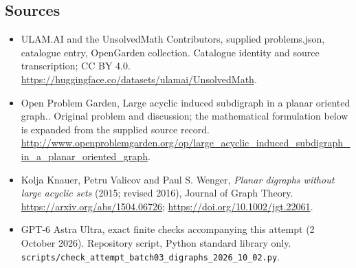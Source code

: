 \documentclass[11pt,a4paper]{article}
\begin{document}
\subsection{Sources}
\begin{itemize}
\item[S1] ULAM.AI and the UnsolvedMath Contributors, supplied problems.json, catalogue entry, OpenGarden collection. Catalogue identity and source transcription; CC BY 4.0.
\url{https://huggingface.co/datasets/ulamai/UnsolvedMath}.
\item[S2] Open Problem Garden, Large acyclic induced subdigraph in a planar oriented graph.. Original problem and discussion; the mathematical formulation below is expanded from the supplied source record.
\url{http://www.openproblemgarden.org/op/large_acyclic_induced_subdigraph_in_a_planar_oriented_graph}.
\item[S3] Kolja Knauer, Petru Valicov and Paul S. Wenger, \emph{Planar digraphs without large acyclic sets} (2015; revised 2016), Journal of Graph Theory. \url{https://arxiv.org/abs/1504.06726}; \url{https://doi.org/10.1002/jgt.22061}.
\item[S9] GPT-6 Astra Ultra, exact finite checks accompanying this attempt (2 October 2026). Repository script, Python standard library only. \texttt{scripts/check\_attempt\_batch03\_digraphs\_2026\_10\_02.py}.
\end{itemize}
\end{document}

